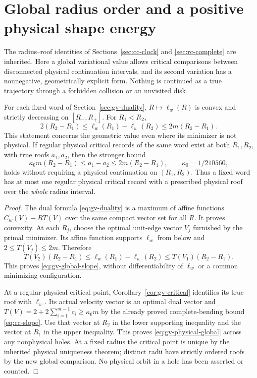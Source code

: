\section{Global radius order and a positive physical shape energy}
\label{sec:gv-radius}
The radius--roof identities of Sections~\ref{sec:cc-clock} and
\ref{sec:rc-complete} are inherited. Here a global variational value
allows critical comparisons between disconnected physical continuation
intervals, and its second variation has a nonnegative, geometrically
explicit form. Nothing is continued as a true trajectory through a
forbidden collision or an unvisited disk.

\begin{theorem}
\label{thm:gv-convex-radius}
For each fixed word of Section~\ref{sec:gv-duality}, $R\mapsto\ell_w(R)$
is convex and strictly decreasing on $[R_-,R_+]$. For $R_1<R_2$,
\begin{equation}\label{eq:gv-global-slope}
 2(R_2-R_1)\le\ell_w(R_1)-\ell_w(R_2)\le2m(R_2-R_1).
\end{equation}
This statement concerns the geometric value even where its minimizer
is not physical. If regular physical critical records of the same word
exist at both $R_1,R_2$, with true roofs $a_1,a_2$, then the stronger bound
\begin{equation}\label{eq:gv-physical-global}
 \kappa_0m(R_2-R_1)\le a_1-a_2\le2m(R_2-R_1),
 \qquad\kappa_0=1/210560,
\end{equation}
holds without requiring a physical continuation on $(R_1,R_2)$.
Thus a fixed word has at most one regular physical critical record
with a prescribed physical roof over the \emph{whole} radius interval.
\end{theorem}
\begin{proof}
The dual formula \eqref{eq:gv-duality} is a maximum of affine functions
$C_w(V)-RT(V)$ over the same compact vector set for all $R$.
It proves convexity. At each $R_j$, choose the optimal unit-edge
vector $V_j$ furnished by the primal minimizer. Its affine function
supports $\ell_w$ from below and $2\le T(V_j)\le2m$. Therefore
\[
 T(V_2)(R_2-R_1)
 \le\ell_w(R_1)-\ell_w(R_2)
 \le T(V_1)(R_2-R_1).
\]
This proves \eqref{eq:gv-global-slope}, without differentiability of
$\ell_w$ or a common minimizing configuration.

At a regular physical critical point, Corollary~\ref{cor:gv-critical}
identifies its true roof with $\ell_w$. Its actual velocity vector
is an optimal dual vector and
$T(V)=2+2\sum_{i=1}^{m-1}c_i\ge\kappa_0m$ by the already proved
complete-bending bound \eqref{eq:cc-slope}. Use that vector at $R_2$
in the lower supporting inequality and the vector at $R_1$ in the
upper inequality. This proves \eqref{eq:gv-physical-global} across
any nonphysical holes. At a fixed radius the critical point is unique
by the inherited physical uniqueness theorem; distinct radii have
strictly ordered roofs by the new global comparison. No physical
orbit in a hole has been asserted or counted.
\end{proof}

